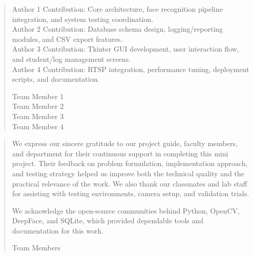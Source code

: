 \documentclass{fisatprojectfinal}
\begin{document}
\newpage
\renewcommand\abstractname{Contribution by Author}
\thispagestyle{plain}
\begin{abstract}
	\vspace{5cm}
	Author 1 Contribution: Core architecture, face recognition pipeline integration, and system testing coordination. \\
	Author 2 Contribution: Database schema design, logging/reporting modules, and CSV export features. \\
	Author 3 Contribution: Tkinter GUI development, user interaction flow, and student/log management screens. \\
	Author 4 Contribution: RTSP integration, performance tuning, deployment scripts, and documentation. \\
	\vspace{1cm}
	\begin{flushright}
		Team Member 1 \\
		Team Member 2 \\
		Team Member 3 \\
		Team Member 4
	\end{flushright}
\end{abstract}

\newpage
\renewcommand\abstractname{ACKNOWLEDGMENT}
\thispagestyle{plain}
\begin{abstract}
	\vspace{5cm}
	We express our sincere gratitude to our project guide, faculty members, and department for their continuous support in completing this mini project. Their feedback on problem formulation, implementation approach, and testing strategy helped us improve both the technical quality and the practical relevance of the work. We also thank our classmates and lab staff for assisting with testing environments, camera setup, and validation trials.

	We acknowledge the open-source communities behind Python, OpenCV, DeepFace, and SQLite, which provided dependable tools and documentation for this work.
	\vspace{1cm}
	\begin{flushright}
		Team Members
	\end{flushright}
\end{abstract}

\newpage
\thispagestyle{empty}
\restoregeometry
\newpage

\thispagestyle{empty}
\setcounter{page}{0}
\tableofcontents
\thispagestyle{empty}
\newpage

\cleardoublepage
{}
\thispagestyle{empty}
\listoffigures
\thispagestyle{empty}
\newpage
\end{document}
